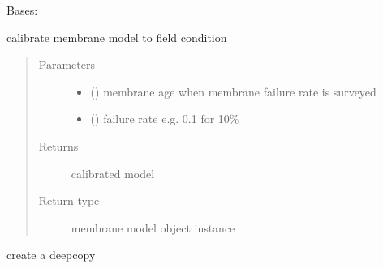 \documentclass[letterpaper,10pt,english]{sphinxmanual}
\begin{document}
\begin{fulllineitems}
\label{\detokenize{membrane:membrane.Membrane_Model}}
\sphinxAtStartPar
Bases: 

\begin{fulllineitems}
\label{\detokenize{membrane:membrane.Membrane_Model.calibrate}}
\sphinxAtStartPar
calibrate membrane model to field condition
\begin{quote}\begin{description}
\item[{Parameters}] \leavevmode\begin{itemize}
\item {} 
\sphinxAtStartPar
{} (\sphinxstyleliteralemphasis{\sphinxupquote{, }}) \textendash{} membrane age when membrane failure rate is surveyed

\item {} 
\sphinxAtStartPar
{} () \textendash{} failure rate e.g. 0.1 for 10\%

\end{itemize}

\item[{Returns}] \leavevmode
\sphinxAtStartPar
calibrated model

\item[{Return type}] \leavevmode
\sphinxAtStartPar
membrane model object instance

\end{description}\end{quote}

\end{fulllineitems}


\begin{fulllineitems}
\label{\detokenize{membrane:membrane.Membrane_Model.copy}}
\sphinxAtStartPar
create a deepcopy


\end{fulllineitems}
\end{fulllineitems}
\end{document}
